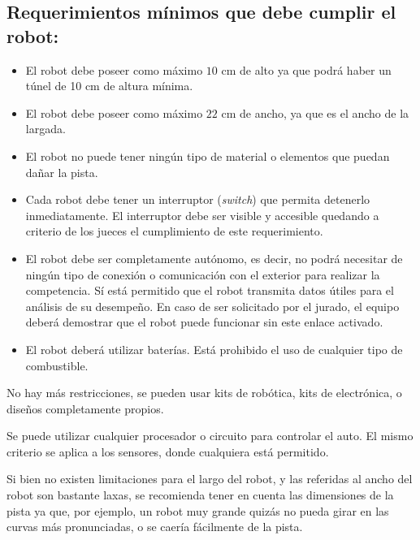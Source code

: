\documentclass[a4paper,11pt]{article}
\newcommand{\cm}{\ensuremath{\mbox{~cm}}}
\begin{document}
\subsection*{Requerimientos mínimos que debe cumplir el robot:}
\begin{itemize}
  \item El robot debe poseer como máximo $10\cm$ de alto ya que podrá haber un túnel de 10 cm de altura mínima.
  \item El robot debe poseer como máximo $22\cm$ de ancho, ya que es el ancho de la largada.
  \item El robot no puede tener ningún tipo de material o elementos que puedan dañar la pista.
  \item Cada robot debe tener un interruptor (\emph{switch}) que permita detenerlo inmediatamente. El interruptor debe ser visible y accesible quedando a criterio de los jueces el cumplimiento de este requerimiento.
  \item El robot debe ser completamente autónomo, es decir, no podrá necesitar de ningún tipo de conexión o comunicación con el exterior para realizar la competencia. Sí está permitido que el robot transmita datos útiles para el análisis de su desempeño. En caso de ser solicitado por el jurado, el equipo deberá demostrar que el robot puede funcionar sin este enlace activado.
  \item El robot deberá utilizar baterías. Está prohibido el uso de cualquier tipo de combustible.
\end{itemize}

No hay más restricciones, se pueden usar kits de robótica, kits de electrónica, o diseños completamente propios.

Se puede utilizar cualquier procesador o circuito para controlar el auto. El mismo criterio se aplica a los sensores, donde cualquiera está permitido.

Si bien no existen limitaciones para el largo del robot, y las referidas al ancho del robot son bastante laxas, se recomienda tener en cuenta las dimensiones de la pista ya que, por ejemplo, un robot muy grande quizás no pueda girar en las curvas más pronunciadas, o se caería fácilmente de la pista.
\end{document}
